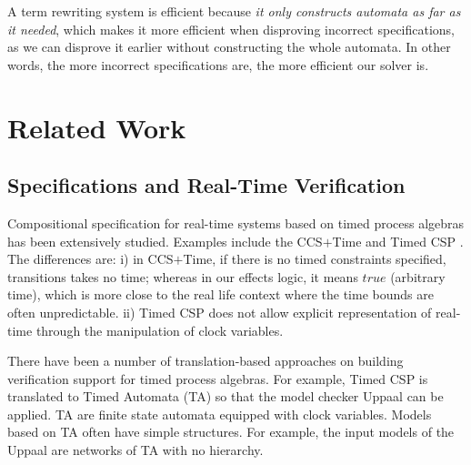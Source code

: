 \documentclass[acmsmall,10pt,review]{acmart}
\newcommand{\code}[1]{{\tt{\ensuremath{\m{#1}}}}}
\newcommand{\m}{\mathit}
\begin{document}
{{{A term rewriting system is efficient because \emph{it only constructs automata as far as it needed}, 
which makes it more efficient when disproving incorrect specifications, as we can disprove it 
earlier without constructing the whole automata. In other words, the more incorrect specifications 
are, the more efficient our solver is.






\section{Related Work}\label{sec:Related_work}





\subsection{Specifications and Real-Time Verification}






Compositional specification for real-time systems based on timed process algebras has been extensively studied. Examples include the CCS\code{\text{+}}Time \cite{DBLP:conf/icalp/Yi91} and Timed CSP \cite{DBLP:journals/tse/DongHQSY08}.  
The differences are: 
i) in CCS\code{\text{+}}Time, if there is no timed constraints specified, transitions takes no time; whereas in our effects logic, it means \code{true} (arbitrary time), which is more close to the real life context where the time bounds are often unpredictable.
ii) Timed CSP does not allow explicit representation of real-time through the manipulation of clock variables.



There have been a number of translation-based approaches on building verification support for timed process algebras. For example, Timed CSP \cite{DBLP:journals/tse/DongHQSY08} is translated to Timed Automata (TA) so that the model checker Uppaal can be \cite{DBLP:journals/sttt/LarsenPY97} applied. 
TA are finite state automata equipped with clock variables. Models based on TA often have simple structures. For example, the input models of the Uppaal are networks of TA with no hierarchy. 

}}}
\end{document}
